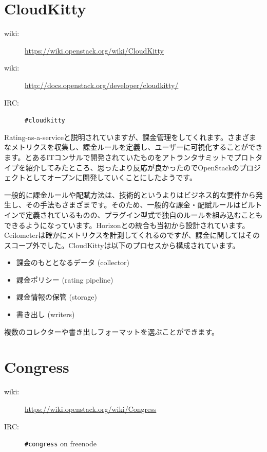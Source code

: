 \section{CloudKitty}

\begin{description}
	\item[wiki:] \url{https://wiki.openstack.org/wiki/CloudKitty}
	\item[wiki:] \url{http://docs.openstack.org/developer/cloudkitty/}
	\item[IRC:] \verb|#cloudkitty|
\end{description}

Rating-as-a-serviceと説明されていますが、課金管理をしてくれます。さまざまなメトリクスを収集し、課金ルールを定義し、ユーザーに可視化することができます。とあるITコンサルで開発されていたものをアトランタサミットでプロトタイプを紹介してみたところ、思ったより反応が良かったのでOpenStackのプロジェクトとしてオープンに開発していくことにしたようです。

一般的に課金ルールや配賦方法は、技術的というよりはビジネス的な要件から発生し、その手法もさまざまです。そのため、一般的な課金・配賦ルールはビルトインで定義されているものの、プラグイン型式で独自のルールを組み込むこともできるようになっています。Horizonとの統合も当初から設計されています。Ceilometerは確かにメトリクスを計測してくれるのですが、課金に関してはそのスコープ外でした。CloudKittyは以下のプロセスから構成されています。

\begin{itemize}
	\item 課金のもととなるデータ (collector)
	\item 課金ポリシー (rating pipeline)
	\item 課金情報の保管 (storage)
	\item 書き出し (writers)
\end{itemize}

複数のコレクターや書き出しフォーマットを選ぶことができます。

\section{Congress}

\begin{description}
	\item[wiki:] \url{https://wiki.openstack.org/wiki/Congress}
	\item[IRC:] \verb|#congress| on freenode
\end{description}

